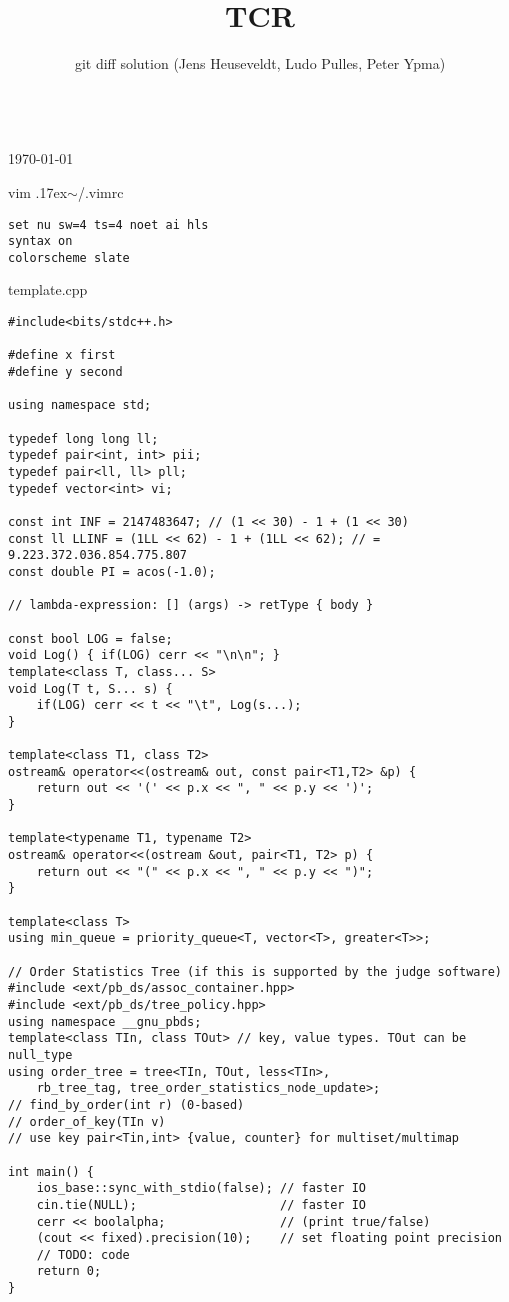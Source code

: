 \documentclass{article}
\title{TCR}
\author{git diff solution (Jens Heuseveldt, Ludo Pulles, Peter Ypma)}
\begin{document}
\maketitle
\begin{center}
	\makeatletter
	\textbf{\@title} \\
	\today \\
	\emph{\@author}
	\makeatother
\end{center}

\tableofcontents

\begin{center}
vim {\raise.17ex\hbox{$\scriptstyle\sim$}}/.vimrc
\end{center}

\begin{lstlisting}[]
set nu sw=4 ts=4 noet ai hls
syntax on
colorscheme slate
\end{lstlisting}

\begin{center}
template.cpp
\end{center}

\begin{lstlisting}
#include<bits/stdc++.h>

#define x first
#define y second

using namespace std;

typedef long long ll;
typedef pair<int, int> pii;
typedef pair<ll, ll> pll;
typedef vector<int> vi;

const int INF = 2147483647; // (1 << 30) - 1 + (1 << 30)
const ll LLINF = (1LL << 62) - 1 + (1LL << 62); // = 9.223.372.036.854.775.807
const double PI = acos(-1.0);

// lambda-expression: [] (args) -> retType { body }

const bool LOG = false;
void Log() { if(LOG) cerr << "\n\n"; }
template<class T, class... S>
void Log(T t, S... s) {
	if(LOG) cerr << t << "\t", Log(s...);
}

template<class T1, class T2>
ostream& operator<<(ostream& out, const pair<T1,T2> &p) {
	return out << '(' << p.x << ", " << p.y << ')';
}

template<typename T1, typename T2>
ostream& operator<<(ostream &out, pair<T1, T2> p) {
	return out << "(" << p.x << ", " << p.y << ")";
}

template<class T>
using min_queue = priority_queue<T, vector<T>, greater<T>>;

// Order Statistics Tree (if this is supported by the judge software)
#include <ext/pb_ds/assoc_container.hpp>
#include <ext/pb_ds/tree_policy.hpp>
using namespace __gnu_pbds;
template<class TIn, class TOut> // key, value types. TOut can be null_type
using order_tree = tree<TIn, TOut, less<TIn>,
	rb_tree_tag, tree_order_statistics_node_update>;
// find_by_order(int r) (0-based)
// order_of_key(TIn v)
// use key pair<Tin,int> {value, counter} for multiset/multimap

int main() {
	ios_base::sync_with_stdio(false); // faster IO
	cin.tie(NULL);                    // faster IO
	cerr << boolalpha;                // (print true/false)
	(cout << fixed).precision(10);    // set floating point precision
	// TODO: code
	return 0;
}
\end{lstlisting}
\end{document}
